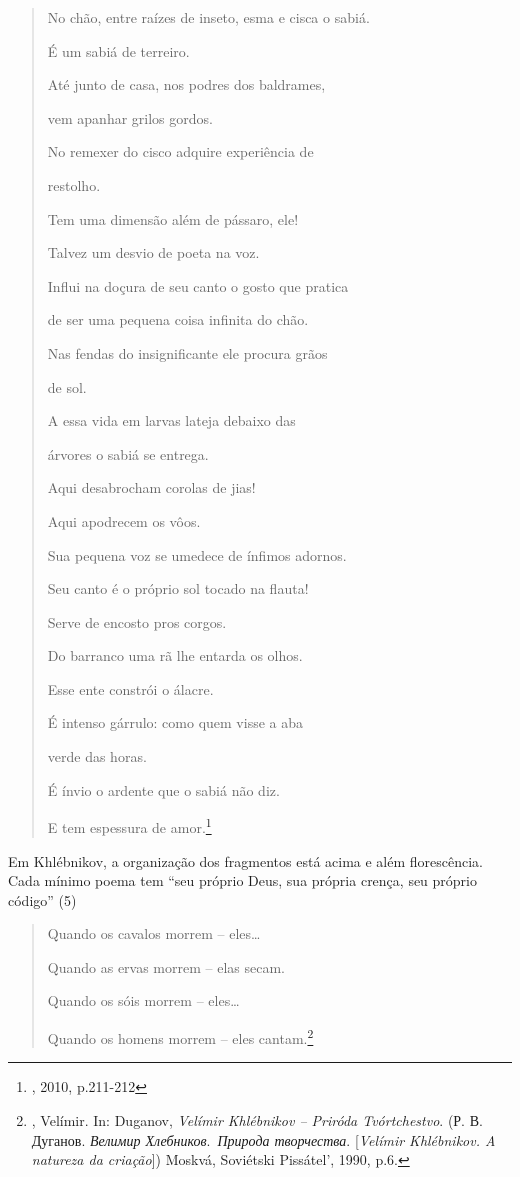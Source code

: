\begin{quote}
No chão, entre raízes de inseto, esma e cisca o sabiá.

É um sabiá de terreiro.

Até junto de casa, nos podres dos baldrames,

vem apanhar grilos gordos.

No remexer do cisco adquire experiência de

restolho.

Tem uma dimensão além de pássaro, ele!

Talvez um desvio de poeta na voz.

Influi na doçura de seu canto o gosto que pratica

de ser uma pequena coisa infinita do chão.

Nas fendas do insignificante ele procura grãos

de sol.

A essa vida em larvas lateja debaixo das

árvores o sabiá se entrega.

Aqui desabrocham corolas de jias!

Aqui apodrecem os vôos.

Sua pequena voz se umedece de ínfimos adornos.

Seu canto é o próprio sol tocado na flauta!

Serve de encosto pros corgos.

Do barranco uma rã lhe entarda os olhos.

Esse ente constrói o álacre.

É intenso gárrulo: como quem visse a aba

verde das horas.

É ínvio o ardente que o sabiá não diz.

E tem espessura de amor.\footnote{, 2010, p.211-212}
\end{quote}

Em Khlébnikov, a organização dos fragmentos está acima e além
florescência. Cada mínimo poema tem ``seu próprio Deus, sua própria
crença, seu próprio código'' (5)

\begin{quote}
Quando os cavalos morrem -- eles\ldots{}

Quando as ervas morrem -- elas secam.

Quando os sóis morrem -- eles\ldots{}

Quando os homens morrem -- eles cantam.\footnote{, Velímir.
  In: Duganov,  \emph{Velímir Khlébnikov -- Priróda Tvórtchestvo}.
  (Р. В. Дуганов. \emph{Велимир Хлебников}.~\emph{Природа творчества}.
  {[}\emph{Velímir Khlébnikov. A natureza da criação}{]}) Moskvá,
  Soviétski Pissátel', 1990, p.6.}
\end{quote}

